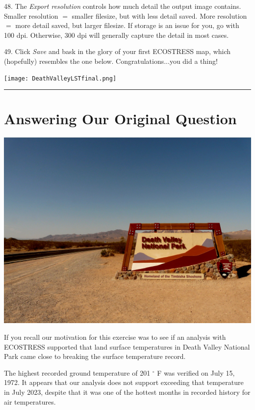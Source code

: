 \documentclass[oneside,a4paper,11pt,explicit]{book}
\begin{document}
48. The \textit{Export resolution} controls how much detail the output image contains. Smaller resolution $=$ smaller filesize, but with less detail saved. More resolution $=$ more detail saved, but larger filesize. If storage is an issue for you, go with 100 dpi. Otherwise, 300 dpi will generally capture the detail in most cases.

49. Click \textit{Save} and bask in the glory of your first ECOSTRESS map, which (hopefully) resembles the one below. Congratulations...you did a thing!


\centerline{\texttt{[image: DeathValleyLSTfinal.png]}}

\vspace{.25em}

\hrule

\section{Answering Our Original Question}

\centerline{\includegraphics[width=.75\textwidth]{DeathValleySign.jpg}}

If you recall our motivation for this exercise was to see if an analysis with ECOSTRESS supported that land surface temperatures in Death Valley National Park came close to breaking the surface temperature record. 

The highest recorded ground temperature of 201 $^{\circ}$ F was verified on July 15, 1972. It appears that our analysis does not support exceeding that temperature in July 2023, despite that it was one of the hottest months in recorded history for air temperatures. 
\end{document}
